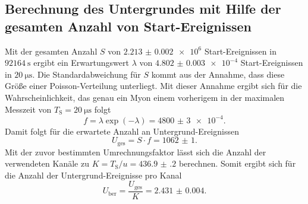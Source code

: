 \subsection{Berechnung des Untergrundes mit Hilfe der gesamten Anzahl von Start-Ereignissen}
\label{subsec:Berechnung}
Mit der gesamten Anzahl $S$ von $\num{2.213(2)e6}$ Start-Ereignissen in $\SI{92164}{\second}$ ergibt ein Erwartungswert $\lambda$ von $\num{4.802(3)e-4}$ Start-Ereignissen in $\SI{20}{\micro\second}$. Die Standardabweichung für $S$ kommt aus der Annahme, dass diese Größe einer Poisson-Verteilung unterliegt. Mit dieser Annahme ergibt sich für die Wahrscheinlichkeit, das genau ein Myon einem vorherigem in der maximalen Messzeit von $T_\text{S}=\SI{20}{\micro\second}$ folgt 
\begin{displaymath}
f=\lambda \exp(-\lambda)=\num{4800(3)e-4}.
\end{displaymath}
Damit folgt für die erwartete Anzahl an Untergrund-Ereignissen
\begin{displaymath}
U_\text{ges}=S \cdot f =\num{1062(1)}.
\end{displaymath}
Mit der zuvor bestimmten Umrechnungsfaktor lässt sich die Anzahl der verwendeten Kanäle zu $K=T_\text{S} / u=\num{436.9(2)}$ berechnen.
Somit ergibt sich für die Anzahl der Untergrund-Ereignisse pro Kanal
\begin{displaymath}
U_\text{ber}=\frac{U_\text{ges}}{K} =\num{2.431(4)}.
\end{displaymath}


